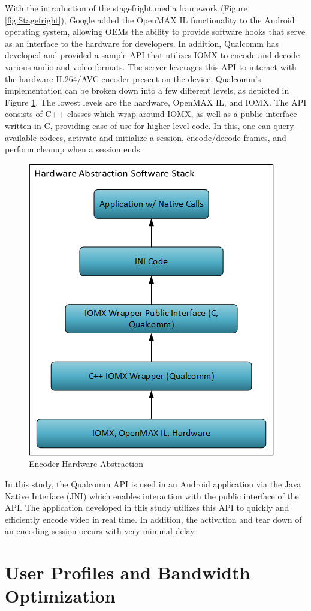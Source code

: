 With the introduction of the stagefright media framework (Figure \ref{fig:Stagefright}), Google added the OpenMAX IL functionality to the Android operating system, allowing OEMs the ability to provide software hooks that serve as an interface to the hardware for developers.
In addition, Qualcomm has developed and provided a sample API that utilizes IOMX to encode and decode various audio and video formats. The server leverages this API to interact with the hardware H.264/AVC encoder present on the device. Qualcomm's implementation can be broken down into a few different levels, as depicted in Figure \ref{fig:QualcommAPI}. The lowest levels are the hardware, OpenMAX IL, and IOMX. The API consists of C++ classes which wrap around IOMX, as well as a public interface written in C, providing ease of use for higher level code. In this, one can query available codecs, activate and initialize a session, encode/decode frames, and perform cleanup when a session ends.
\begin{figure}[H]
\centering
\includegraphics[width=0.4\linewidth]{images/QualcommAPI.png}
\caption{Encoder Hardware Abstraction}
\label{fig:QualcommAPI}
\end{figure}
In this study, the Qualcomm API is used in an Android application via the Java Native Interface (JNI) which enables interaction with the public interface of the API. The application developed in this study utilizes this API to quickly and efficiently encode video in real time. In addition, the activation and tear down of an encoding session occurs with very minimal delay.


\section{User Profiles and Bandwidth Optimization}
\label{sec:UserProfiles}

